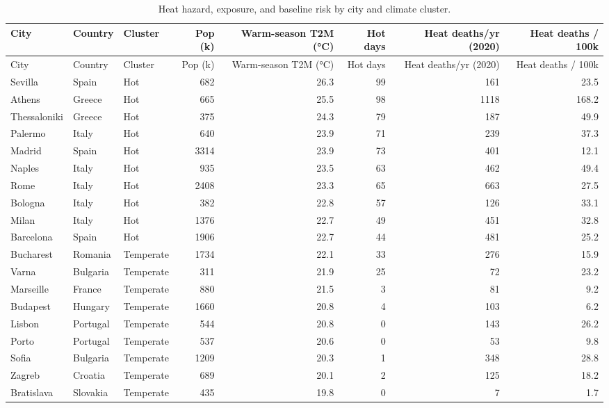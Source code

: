 \begingroup\footnotesize
\begin{longtable}{lllrrrrr}
\caption{Heat hazard, exposure, and baseline risk by city and climate cluster.} \\ 
  \toprule
City & Country & Cluster & Pop (k) & Warm-season T2M (°C) & Hot days & Heat deaths/yr (2020) & Heat deaths / 100k \\ 
  \midrule
\endfirsthead
  \toprule
City & Country & Cluster & Pop (k) & Warm-season T2M (°C) & Hot days & Heat deaths/yr (2020) & Heat deaths / 100k \\ 
  \midrule
\endhead
Sevilla & Spain & Hot & 682 & 26.3 & 99 & 161 & 23.5 \\ 
  Athens & Greece & Hot & 665 & 25.5 & 98 & 1118 & 168.2 \\ 
  Thessaloniki & Greece & Hot & 375 & 24.3 & 79 & 187 & 49.9 \\ 
  Palermo & Italy & Hot & 640 & 23.9 & 71 & 239 & 37.3 \\ 
  Madrid & Spain & Hot & 3314 & 23.9 & 73 & 401 & 12.1 \\ 
  Naples & Italy & Hot & 935 & 23.5 & 63 & 462 & 49.4 \\ 
  Rome & Italy & Hot & 2408 & 23.3 & 65 & 663 & 27.5 \\ 
  Bologna & Italy & Hot & 382 & 22.8 & 57 & 126 & 33.1 \\ 
  Milan & Italy & Hot & 1376 & 22.7 & 49 & 451 & 32.8 \\ 
  Barcelona & Spain & Hot & 1906 & 22.7 & 44 & 481 & 25.2 \\ 
  Bucharest & Romania & Temperate & 1734 & 22.1 & 33 & 276 & 15.9 \\ 
  Varna & Bulgaria & Temperate & 311 & 21.9 & 25 & 72 & 23.2 \\ 
  Marseille & France & Temperate & 880 & 21.5 & 3 & 81 & 9.2 \\ 
  Budapest & Hungary & Temperate & 1660 & 20.8 & 4 & 103 & 6.2 \\ 
  Lisbon & Portugal & Temperate & 544 & 20.8 & 0 & 143 & 26.2 \\ 
  Porto & Portugal & Temperate & 537 & 20.6 & 0 & 53 & 9.8 \\ 
  Sofia & Bulgaria & Temperate & 1209 & 20.3 & 1 & 348 & 28.8 \\ 
  Zagreb & Croatia & Temperate & 689 & 20.1 & 2 & 125 & 18.2 \\ 
  Bratislava & Slovakia & Temperate & 435 & 19.8 & 0 & 7 & 1.7 \\ 

\end{longtable}
